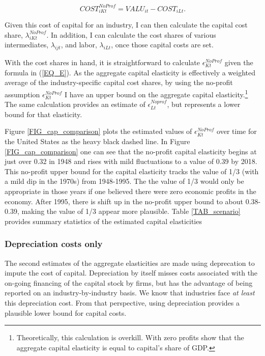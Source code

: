 \documentclass[11pt]{article}
\begin{document}
\begin{equation}
	COST^{NoProf}_{iKt} = VALU_{it} - COST_{iLt}. \label{EQ_noprofit}
\end{equation}

Given this cost of capital for an industry, I can then calculate the capital cost share, $\lambda_{iKt}^{NoProf}$. In addition, I can calculate the cost shares of various intermediates, $\lambda_{ijt}$, and labor, $\lambda_{iLt}$, once those capital costs are set. 

With the cost shares in hand, it is straightforward to calculate $\epsilon_{Kt}^{NoProf}$ given the formula in (\ref{EQ_E}). As the aggregate capital elasticity is effectively a weighted average of the industry-specific capital cost shares, by using the no-profit assumption $\epsilon_{Kt}^{NoProf}$ I have an upper bound on the aggregate capital elasticity.\footnote{Theoretically, this calculation is overkill. With zero profits \cite{bfshortnote,bfprodge} show that the aggregate capital elasticity is equal to capital's share of GDP.} The same calculation provides an estimate of $\epsilon_{Lt}^{Noprof}$, but represents a lower bound for that elasticity.

Figure \ref{FIG_cap_comparison} plots the estimated values of $\epsilon_{Kt}^{NoProf}$ over time for the United States as the heavy black dashed line. In Figure \ref{FIG_cap_comparison} one can see that the no-profit capital elasticity begins at just over 0.32 in 1948 and rises with mild fluctuations to a value of 0.39 by 2018. This no-profit upper bound for the capital elasticity tracks the value of 1/3 (with a mild dip in the 1970s) from 1948-1995. The the value of 1/3 would only be appropriate in those years if one believed there were zero economic profits in the economy. After 1995, there is shift up in the no-profit upper bound to about 0.38-0.39, making the value of 1/3 appear more plausible. Table \ref{TAB_scenario} provides summary statistics of the estimated capital elasticities

\subsubsection{Depreciation costs only}
The second estimates of the aggregate elasticities are made using deprecation to impute the cost of capital. Depreciation by itself misses costs associated with the on-going financing of the capital stock by firms, but has the advantage of being reported on an industry-by-industry basis. We know that industries face \textit{at least} this depreciation cost. From that perspective, using depreciation provides a plausible lower bound for capital costs.
\end{document}
